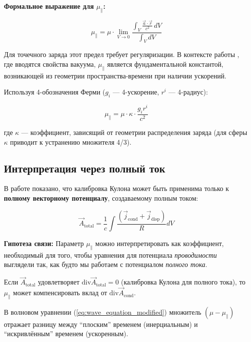 \documentclass[12pt, a4paper]{article}
\begin{document}
\textbf{Формальное выражение для $\mu_{\parallel}$:}

\begin{equation}
\mu_{\parallel} = \mu \cdot \lim_{V \to 0} \frac{\int_V \frac{\vec{a} \cdot \vec{r}}{c^2} \, dV}{\int_V dV}
\label{eq:mu_parallel_formal}
\end{equation}

Для точечного заряда этот предел требует регуляризации. В контексте работы \cite{NikolaevLorentz}, где вводятся свойства вакуума, $\mu_{\parallel}$ является фундаментальной константой, возникающей из геометрии пространства-времени при наличии ускорений.

Используя 4-обозначения Ферми ($g_i$ --- 4-ускорение, $r^i$ --- 4-радиус):

\begin{equation}
\mu_{\parallel} = \mu \cdot \kappa \cdot \frac{g_i r^i}{c^2}
\label{eq:mu_parallel_4vector}
\end{equation}

где $\kappa$ --- коэффициент, зависящий от геометрии распределения заряда (для сферы $\kappa$ приводит к устранению множителя 4/3).

\subsection{Интерпретация через полный ток}

В работе \cite{CoulombCalib} показано, что калибровка Кулона может быть применима только к \textbf{полному векторному потенциалу}, создаваемому полным током:

\begin{equation}
\vec{A}_{\text{total}} = \frac{1}{c} \int \frac{(\vec{j}_{\text{cond}} + \vec{j}_{\text{disp}})}{R} dV
\label{eq:total_potential_again}
\end{equation}

\textbf{Гипотеза связи:} Параметр $\mu_{\parallel}$ можно интерпретировать как коэффициент, необходимый для того, чтобы уравнения для потенциала \textit{проводимости} выглядели так, как будто мы работаем с потенциалом \textit{полного тока}.

Если $\vec{A}_{\text{total}}$ удовлетворяет $\text{div} \vec{A}_{\text{total}} = 0$ (калибровка Кулона для полного тока), то $\mu_{\parallel}$ может компенсировать вклад от $\text{div} \vec{A}_{\text{cond}}$.

В волновом уравнении (\ref{eq:wave_equation_modified}) множитель $(\mu - \mu_{\parallel})$ отражает разницу между ``плоским'' временем (инерциальным) и ``искривлённым'' временем (ускоренным).
\end{document}
